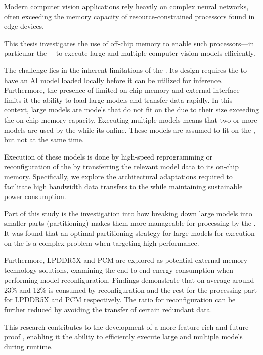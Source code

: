 Modern computer vision applications rely heavily on complex neural networks, often exceeding the memory capacity of resource-constrained processors found in edge devices.

This thesis investigates the use of off-chip memory to enable such processors---in particular the \graicore{}---to execute large and multiple computer vision models efficiently.

The challenge lies in the inherent limitations of the \graicore{}.
Its design requires the \graicore{} to have an AI model loaded locally before it can be utilized for inference.
Furthermore, the presence of limited on-chip memory and external interface limits it the ability to load large models and transfer data rapidly.
In this context, large models are models that do not fit on the \graicore{} due to their size exceeding the on-chip memory capacity.
Executing multiple models means that two or more models are used by the \graicore{} while its online.
These models are assumed to fit on the \graicore{}, but not at the same time.

Execution of these models is done by high-speed reprogramming or reconfiguration of the \graicore{} by transferring the relevant model data to its on-chip memory.
Specifically, we explore the architectural adaptations required to facilitate high bandwidth data transfers to the \graicore{} while maintaining sustainable power consumption.

Part of this study is the investigation into how breaking down large models into smaller parts (partitioning) makes them more manageable for processing by the \graicore{}.
It was found that an optimal partitioning strategy for large models for execution on the \graicore{} is a complex problem when targeting high performance.

Furthermore, LPDDR5X and PCM are explored as potential external memory technology solutions, examining the end-to-end energy consumption when performing model reconfiguration.
Findings demonstrate that on average around 23\% and 12\% is consumed by reconfiguration and the rest for the processing part for LPDDR5X and PCM respectively.
The ratio for reconfiguration can be further reduced by avoiding the transfer of certain redundant data. %

This research contributes to the development of a more feature-rich and future-proof \graicore{}, enabling it the ability to efficiently execute large and multiple models during runtime.
